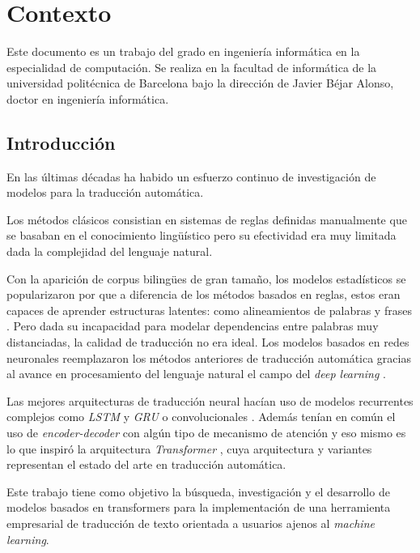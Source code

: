 \section{Contexto}
Este documento es un trabajo del grado en ingeniería informática en la especialidad
de computación. Se realiza en la facultad de informática de la universidad politécnica
de Barcelona bajo la dirección de Javier Béjar Alonso, doctor en ingeniería informática.

\subsection{Introducción}\label{intro}
En las últimas décadas ha habido un esfuerzo continuo de investigación de modelos para la traducción
automática.

Los métodos clásicos consistian en sistemas de reglas definidas manualmente que se
basaban en el conocimiento lingüístico pero su efectividad era muy limitada dada la complejidad del lenguaje
natural.

Con la aparición de corpus bilingües de gran tamaño, los modelos estadísticos se popularizaron
por que a diferencia de los métodos basados en reglas, estos eran capaces de aprender
estructuras latentes: como alineamientos de palabras y frases
\cite{HistoryBrown1990ASA, HistoryKoehn2003Jan}. Pero dada su incapacidad para
modelar dependencias entre palabras muy distanciadas, la calidad de traducción no era ideal.
Los modelos basados en redes neuronales \cite{Historykalchbrenner-blunsom-2013, HistoryCho2014Jun,
HistorySutskever2014Sep, HistoryBahdanau2014Sep} reemplazaron los métodos anteriores de
traducción automática gracias al avance en procesamiento del lenguaje natural el campo
del \textit{deep learning} \cite{HistoryTan2020Dec}.

Las mejores arquitecturas de traducción neural hacían uso de modelos recurrentes complejos como
\textit{LSTM} \cite{HistoryHochreiter1997} y \textit{GRU} \cite{HistoryChung2014Dec} o
convolucionales \cite{HistoryGehring2016Nov}. Además tenían en común el uso
de \textit{encoder-decoder} con algún tipo de mecanismo de atención \cite{HistoryBahdanau2014Sep} y
eso mismo es lo que inspiró la arquitectura \textit{Transformer} \cite{Vaswani2017Jun},
cuya arquitectura y variantes representan el estado del arte en traducción automática.

Este trabajo tiene como objetivo la búsqueda, investigación y el desarrollo de modelos
basados en transformers para la implementación de una herramienta
empresarial de traducción de texto orientada a usuarios ajenos al \textit{machine learning}.

